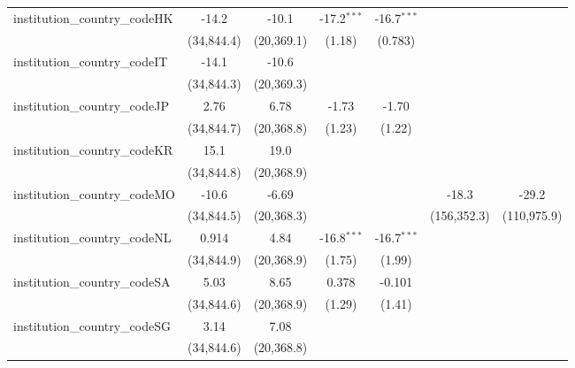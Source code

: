 \begin{tabular}{lcccccc}
   institution\_country\_codeHK          & -14.2        & -10.1        & -17.2$^{***}$ & -16.7$^{***}$ &             &   \\   
                                         & (34,844.4)   & (20,369.1)   & (1.18)        & (0.783)       &             &   \\   
   institution\_country\_codeIT          & -14.1        & -10.6        &               &               &             &   \\   
                                         & (34,844.3)   & (20,369.3)   &               &               &             &   \\   
   institution\_country\_codeJP          & 2.76         & 6.78         & -1.73         & -1.70         &             &   \\   
                                         & (34,844.7)   & (20,368.8)   & (1.23)        & (1.22)        &             &   \\   
   institution\_country\_codeKR          & 15.1         & 19.0         &               &               &             &   \\   
                                         & (34,844.8)   & (20,368.9)   &               &               &             &   \\   
   institution\_country\_codeMO          & -10.6        & -6.69        &               &               & -18.3       & -29.2\\   
                                         & (34,844.5)   & (20,368.3)   &               &               & (156,352.3) & (110,975.9)\\   
   institution\_country\_codeNL          & 0.914        & 4.84         & -16.8$^{***}$ & -16.7$^{***}$ &             &   \\   
                                         & (34,844.9)   & (20,368.9)   & (1.75)        & (1.99)        &             &   \\   
   institution\_country\_codeSA          & 5.03         & 8.65         & 0.378         & -0.101        &             &   \\   
                                         & (34,844.6)   & (20,368.9)   & (1.29)        & (1.41)        &             &   \\   
   institution\_country\_codeSG          & 3.14         & 7.08         &               &               &             &   \\   
                                         & (34,844.6)   & (20,368.8)   &               &               &             &   \\   

\end{tabular}
